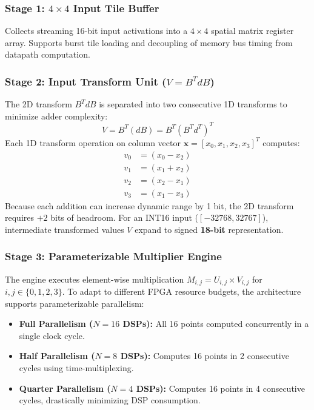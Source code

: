 \documentclass[12pt,a4paper]{article}
\begin{document}
\subsubsection{Stage 1: $4 \times 4$ Input Tile Buffer}
Collects streaming 16-bit input activations into a $4 \times 4$ spatial matrix register array. Supports burst tile loading and decoupling of memory bus timing from datapath computation.

\subsubsection{Stage 2: Input Transform Unit ($V = B^T d B$)}
The 2D transform $B^T d B$ is separated into two consecutive 1D transforms to minimize adder complexity:
\begin{equation}
    V = B^T \left( d B \right) = B^T \left( B^T d^T \right)^T
\end{equation}
Each 1D transform operation on column vector $\mathbf{x} = [x_0, x_1, x_2, x_3]^T$ computes:
\begin{align}
    v_0 & = (x_0 - x_2) \\
    v_1 & = (x_1 + x_2) \\
    v_2 & = (x_2 - x_1) \\
    v_3 & = (x_1 - x_3)
\end{align}
Because each addition can increase dynamic range by 1 bit, the 2D transform requires $+2$ bits of headroom. For an INT16 input ($[-32768, 32767]$), intermediate transformed values $V$ expand to signed \textbf{18-bit} representation.

\subsubsection{Stage 3: Parameterizable Multiplier Engine}
The engine executes element-wise multiplication $M_{i,j} = U_{i,j} \times V_{i,j}$ for $i,j \in \{0, 1, 2, 3\}$. To adapt to different FPGA resource budgets, the architecture supports parameterizable parallelism:
\begin{itemize}
    \item \textbf{Full Parallelism ($N=16$ DSPs):} All 16 points computed concurrently in a single clock cycle.
    \item \textbf{Half Parallelism ($N=8$ DSPs):} Computes 16 points in 2 consecutive cycles using time-multiplexing.
    \item \textbf{Quarter Parallelism ($N=4$ DSPs):} Computes 16 points in 4 consecutive cycles, drastically minimizing DSP consumption.
\end{itemize}
\end{document}
